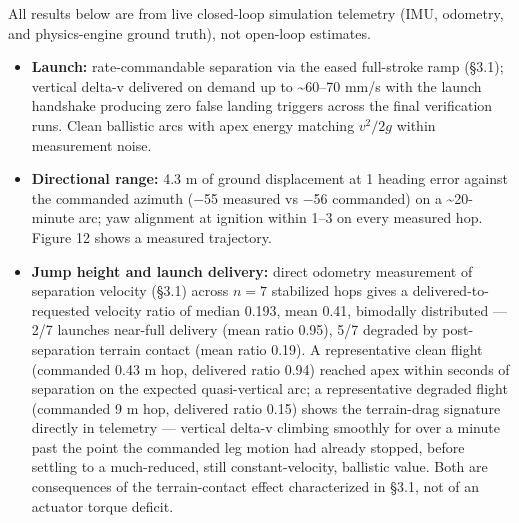 \documentclass[conference]{IEEEtran}
\begin{document}
All results below are from live closed-loop simulation telemetry (IMU, odometry, and physics-engine ground truth), not open-loop estimates.

\begin{itemize}
\item \textbf{Launch:} rate-commandable separation via the eased full-stroke ramp (\S3.1); vertical delta-v delivered on demand up to \textasciitilde{}60--70 mm/s with the launch handshake producing zero false landing triggers across the final verification runs. Clean ballistic arcs with apex energy matching $v^2/2g$ within measurement noise.
\item \textbf{Directional range:} 4.3 m of ground displacement at 1\textdegree{} heading error against the commanded azimuth (\ensuremath{-}55\textdegree{} measured vs \ensuremath{-}56\textdegree{} commanded) on a \textasciitilde{}20-minute arc; yaw alignment at ignition within 1--3\textdegree{} on every measured hop. Figure 12 shows a measured trajectory.
\item \textbf{Jump height and launch delivery:} direct odometry measurement of separation velocity (\S3.1) across $n=7$ stabilized hops gives a delivered-to-requested velocity ratio of median 0.193, mean 0.41, bimodally distributed --- 2/7 launches near-full delivery (mean ratio 0.95), 5/7 degraded by post-separation terrain contact (mean ratio 0.19). A representative clean flight (commanded 0.43 m hop, delivered ratio 0.94) reached apex within seconds of separation on the expected quasi-vertical arc; a representative degraded flight (commanded 9 m hop, delivered ratio 0.15) shows the terrain-drag signature directly in telemetry --- vertical delta-v climbing smoothly for over a minute past the point the commanded leg motion had already stopped, before settling to a much-reduced, still constant-velocity, ballistic value. Both are consequences of the terrain-contact effect characterized in \S3.1, not of an actuator torque deficit.
\end{itemize}
\end{document}
